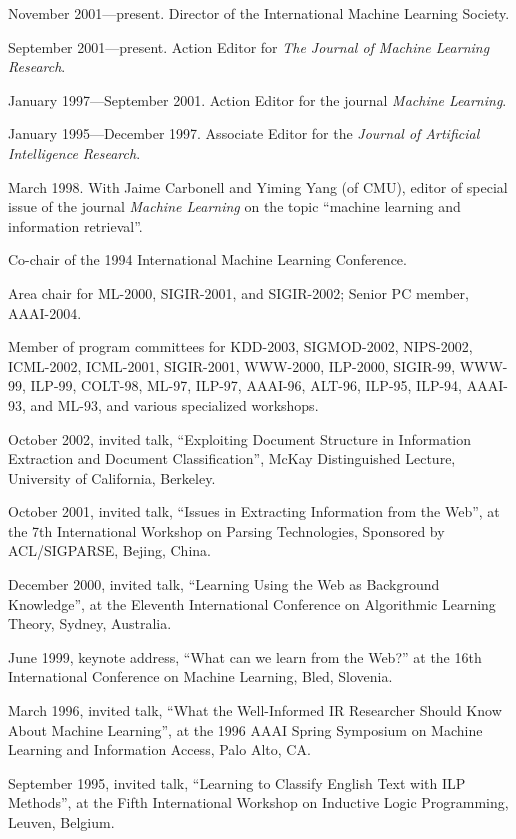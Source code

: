 \bi
\item November 2001---present.  Director of the
International Machine Learning Society.  
\item September 2001---present.  Action Editor for {\it The Journal of Machine Learning Research\/}.
\item January 1997---September 2001. Action Editor for the journal {\it Machine Learning\/}.
\item January 1995---December 1997. Associate Editor for the 
{\it Journal of Artificial Intelligence Research}.
\item March 1998.  With Jaime Carbonell and Yiming Yang (of CMU),
editor of special issue of the journal {\it Machine Learning\/} on the
topic ``{machine learning and information retrieval\/}''.
\item Co-chair of the 1994 International Machine Learning Conference.
\item Area chair for ML-2000, SIGIR-2001, and SIGIR-2002; Senior PC member, AAAI-2004.
\item Member of program committees for KDD-2003, SIGMOD-2002, NIPS-2002, ICML-2002,
ICML-2001, SIGIR-2001, WWW-2000, ILP-2000, SIGIR-99, WWW-99, ILP-99,
COLT-98, ML-97, ILP-97, AAAI-96, ALT-96, ILP-95, ILP-94, AAAI-93, and
ML-93, and various specialized workshops.
\ei

\bi
\item October 2002, invited talk, ``Exploiting Document Structure in
Information Extraction and Document Classification'', McKay
Distinguished Lecture, University of California, Berkeley.
\item October 2001, invited talk, ``Issues in Extracting Information
from the Web'', at the 7th International Workshop on Parsing
Technologies, Sponsored by ACL/SIGPARSE, Bejing, China.
\item December 2000, invited talk, ``Learning Using the Web as Background Knowledge'',
at the Eleventh International Conference on Algorithmic Learning
Theory, Sydney, Australia.
\item June 1999, keynote address, ``What can we learn from the Web?''
at the 16th International Conference on Machine Learning, Bled,
Slovenia.
\item March 1996, invited talk, ``What the Well-Informed IR
Researcher Should Know About Machine Learning'', at the 1996
AAAI Spring Symposium on Machine Learning and Information Access,
Palo Alto, CA.
\item September 1995, invited talk, 
``Learning to Classify English Text with ILP
Methods'', at the Fifth International Workshop on Inductive Logic
Programming, Leuven, Belgium.
\ei

